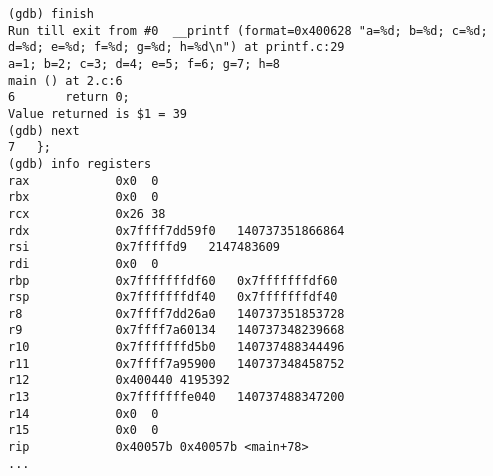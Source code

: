\begin{lstlisting}
(gdb) finish
Run till exit from #0  __printf (format=0x400628 "a=%d; b=%d; c=%d; d=%d; e=%d; f=%d; g=%d; h=%d\n") at printf.c:29
a=1; b=2; c=3; d=4; e=5; f=6; g=7; h=8
main () at 2.c:6
6		return 0;
Value returned is $1 = 39
(gdb) next
7	};
(gdb) info registers
rax            0x0	0
rbx            0x0	0
rcx            0x26	38
rdx            0x7ffff7dd59f0	140737351866864
rsi            0x7fffffd9	2147483609
rdi            0x0	0
rbp            0x7fffffffdf60	0x7fffffffdf60
rsp            0x7fffffffdf40	0x7fffffffdf40
r8             0x7ffff7dd26a0	140737351853728
r9             0x7ffff7a60134	140737348239668
r10            0x7fffffffd5b0	140737488344496
r11            0x7ffff7a95900	140737348458752
r12            0x400440	4195392
r13            0x7fffffffe040	140737488347200
r14            0x0	0
r15            0x0	0
rip            0x40057b	0x40057b <main+78>
...
\end{lstlisting}
